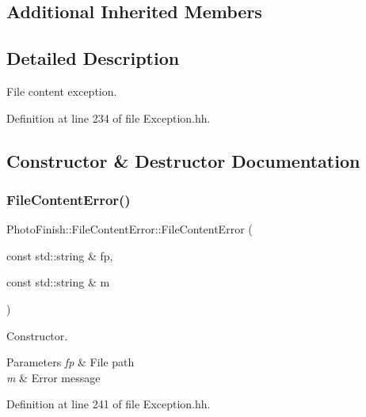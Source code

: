 \subsection*{Additional Inherited Members}


\subsection{Detailed Description}
File content exception. 

Definition at line 234 of file Exception.\+hh.



\subsection{Constructor \& Destructor Documentation}
\mbox{\label{class_photo_finish_1_1_file_content_error_a7a4c7a66b0f98ad1aecbf91313bfcb95}} 
\subsubsection{\texorpdfstring{File\+Content\+Error()}{FileContentError()}\hspace{0.1cm}{\footnotesize\ttfamily [1/2]}}
{\footnotesize\ttfamily Photo\+Finish\+::\+File\+Content\+Error\+::\+File\+Content\+Error (\begin{DoxyParamCaption}\item[{const std\+::string \&}]{fp,  }\item[{const std\+::string \&}]{m }\end{DoxyParamCaption})\hspace{0.3cm}{\ttfamily [inline]}}



Constructor. 


\begin{DoxyParams}{Parameters}
{\em fp} & File path \\
\hline
{\em m} & Error message \\
\hline
\end{DoxyParams}


Definition at line 241 of file Exception.\+hh.

